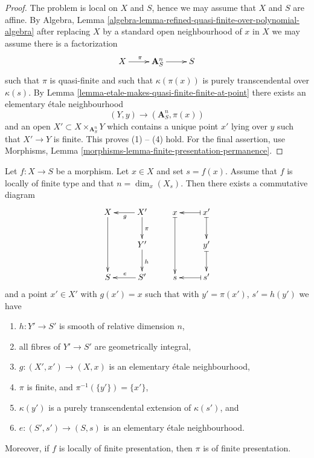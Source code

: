 \begin{proof}
The problem is local on $X$ and $S$, hence we may assume that $X$ and
$S$ are affine. By
Algebra, Lemma \ref{algebra-lemma-refined-quasi-finite-over-polynomial-algebra}
after replacing $X$ by a standard open neighbourhood of $x$ in $X$
we may assume there is a factorization
$$
\xymatrix{
X \ar[r]^\pi & \mathbf{A}^n_S \ar[r] & S
}
$$
such that $\pi$ is quasi-finite and such that $\kappa(\pi(x))$
is purely transcendental over $\kappa(s)$. By
Lemma \ref{lemma-etale-makes-quasi-finite-finite-at-point}
there exists an elementary \'etale neighbourhood
$$
(Y, y) \to (\mathbf{A}^n_S, \pi(x))
$$
and an open $X' \subset X \times_{\mathbf{A}^n_S} Y$ which contains a
unique point $x'$ lying over $y$ such that $X' \to Y$ is finite.
This proves (1) -- (4) hold. For the final assertion, use
Morphisms, Lemma \ref{morphisms-lemma-finite-presentation-permanence}.
\end{proof}

\begin{lemma}
\label{lemma-local-local-structure-finite-type}
Let $f : X \to S$ be a morphism. Let $x \in X$ and set $s = f(x)$.
Assume that $f$ is locally of finite type and that $n = \dim_x(X_s)$.
Then there exists a commutative diagram
$$
\xymatrix{
X \ar[dd] & X' \ar[l]^g \ar[d]^\pi & x \ar@{|->}[dd] &
x' \ar@{|->}[l] \ar@{|->}[d] \\
& Y' \ar[d]^h & & y' \ar@{|->}[d] \\
S & S' \ar[l]_e & s & s' \ar@{|->}[l]
}
$$
and a point $x' \in X'$ with $g(x') = x$ such that with $y' = \pi(x')$,
$s' = h(y')$ we have
\begin{enumerate}
\item $h : Y' \to S'$ is smooth of relative dimension $n$,
\item all fibres of $Y' \to S'$ are geometrically integral,
\item $g : (X', x') \to (X, x)$ is an elementary \'etale neighbourhood,
\item $\pi$ is finite, and $\pi^{-1}(\{y'\}) = \{x'\}$,
\item $\kappa(y')$ is a purely transcendental extension of $\kappa(s')$, and
\item $e : (S', s') \to (S, s)$ is an elementary \'etale neighbourhood.
\end{enumerate}
Moreover, if $f$ is locally of finite presentation, then $\pi$ is
of finite presentation.
\end{lemma}

